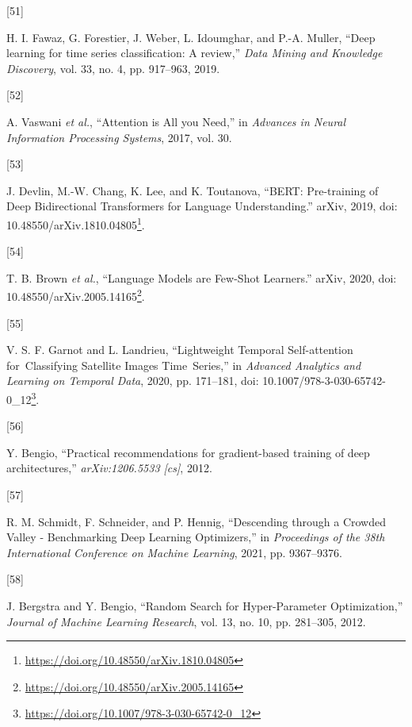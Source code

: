 \documentclass[
  11pt,
]{report}
\newlength{\cslhangindent}
\newlength{\csllabelwidth}
\newlength{\cslentryspacingunit} %
\newenvironment{CSLReferences}[2] %
 {%
  \setlength{\parindent}{0pt}
  \ifodd #1
  \let\oldpar\par
  \def\par{\hangindent=\cslhangindent\oldpar}
  \fi
  \setlength{\parskip}{#2\cslentryspacingunit}
 }%
 {}
\newcommand{\CSLLeftMargin}[1]{\parbox[t]{\csllabelwidth}{#1}}
\newcommand{\CSLRightInline}[1]{\parbox[t]{\linewidth - \csllabelwidth}{#1}\break}
\renewcommand{\href}[2]{#2\footnote{\url{#1}}}
\begin{document}
\begin{CSLReferences}{0}{0}
\leavevmode{}%
\CSLLeftMargin{{[}51{]} }%
\CSLRightInline{H. I. Fawaz, G. Forestier, J. Weber, L. Idoumghar, and
P.-A. Muller, {``Deep learning for time series classification: A
review,''} \emph{Data Mining and Knowledge Discovery}, vol. 33, no. 4,
pp. 917--963, 2019.}

\leavevmode{}%
\CSLLeftMargin{{[}52{]} }%
\CSLRightInline{A. Vaswani \emph{et al.}, {``Attention is {All} you
{Need},''} in \emph{Advances in {Neural Information Processing
Systems}}, 2017, vol. 30.}

\leavevmode{}%
\CSLLeftMargin{{[}53{]} }%
\CSLRightInline{J. Devlin, M.-W. Chang, K. Lee, and K. Toutanova,
{``{BERT}: {Pre-training} of {Deep Bidirectional Transformers} for
{Language Understanding}.''} {arXiv}, 2019, doi:
\href{https://doi.org/10.48550/arXiv.1810.04805}{10.48550/arXiv.1810.04805}.}

\leavevmode{}%
\CSLLeftMargin{{[}54{]} }%
\CSLRightInline{T. B. Brown \emph{et al.}, {``Language {Models} are
{Few-Shot Learners}.''} {arXiv}, 2020, doi:
\href{https://doi.org/10.48550/arXiv.2005.14165}{10.48550/arXiv.2005.14165}.}

\leavevmode{}%
\CSLLeftMargin{{[}55{]} }%
\CSLRightInline{V. S. F. Garnot and L. Landrieu, {``Lightweight
{Temporal Self-attention} for~{Classifying Satellite Images
Time~Series},''} in \emph{Advanced {Analytics} and {Learning} on
{Temporal Data}}, 2020, pp. 171--181, doi:
\href{https://doi.org/10.1007/978-3-030-65742-0_12}{10.1007/978-3-030-65742-0\_12}.}

\leavevmode{}%
\CSLLeftMargin{{[}56{]} }%
\CSLRightInline{Y. Bengio, {``Practical recommendations for
gradient-based training of deep architectures,''} \emph{arXiv:1206.5533
{[}cs{]}}, 2012.}

\leavevmode{}%
\CSLLeftMargin{{[}57{]} }%
\CSLRightInline{R. M. Schmidt, F. Schneider, and P. Hennig,
{``Descending through a {Crowded Valley} - {Benchmarking Deep Learning
Optimizers},''} in \emph{Proceedings of the 38th {International
Conference} on {Machine Learning}}, 2021, pp. 9367--9376.}

\leavevmode{}%
\CSLLeftMargin{{[}58{]} }%
\CSLRightInline{J. Bergstra and Y. Bengio, {``Random {Search} for
{Hyper-Parameter Optimization},''} \emph{Journal of Machine Learning
Research}, vol. 13, no. 10, pp. 281--305, 2012.}


\end{CSLReferences}
\end{document}
